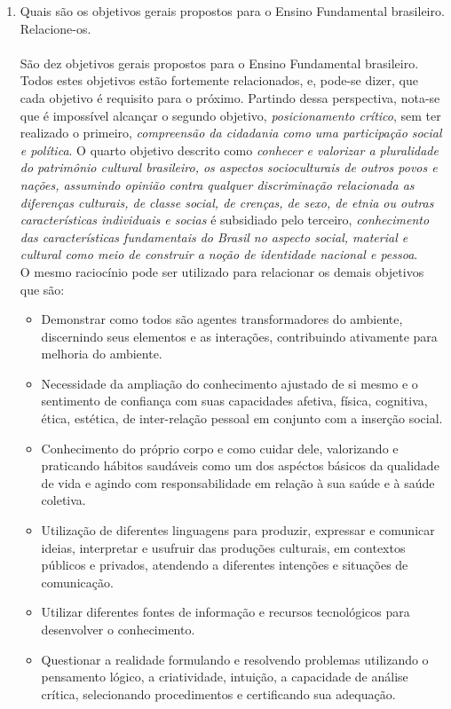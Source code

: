 \documentclass[a4paper, 12pt]{article}
\begin{document}
\begin{enumerate}
\item Quais são os objetivos gerais propostos para o Ensino Fundamental brasileiro. Relacione-os. \\ \\
  São dez objetivos gerais propostos para o Ensino Fundamental brasileiro. Todos estes objetivos estão fortemente relacionados, e, pode-se dizer, que cada objetivo é requisito para o próximo. Partindo dessa perspectiva, nota-se que é impossível alcançar o segundo objetivo, \emph{posicionamento crítico}, sem ter realizado o primeiro, \emph{compreensão da cidadania como uma participação social e política}.  O quarto objetivo descrito como \emph{conhecer e valorizar a pluralidade do patrimônio cultural brasileiro, os aspectos socioculturais de outros povos e nações, assumindo opinião contra qualquer discriminação relacionada as diferenças culturais, de classe social, de crenças, de sexo, de etnia ou outras características individuais e socias} é subsidiado pelo terceiro, \emph{conhecimento das características fundamentais do Brasil no aspecto social, material e cultural como meio de construir a noção de identidade nacional e pessoa}. \\
  O mesmo raciocínio pode ser utilizado para relacionar os demais objetivos que são:
  \begin{itemize}
  \item Demonstrar como todos são agentes transformadores do ambiente, discernindo seus elementos e as interações, contribuindo ativamente para melhoria do ambiente.
  \item Necessidade da ampliação do conhecimento ajustado de si mesmo e o sentimento de confiança com suas capacidades afetiva, física, cognitiva, ética, estética, de inter-relação pessoal em conjunto com a inserção social.
  \item Conhecimento do próprio corpo e como cuidar dele, valorizando e praticando hábitos saudáveis como um dos aspéctos básicos da qualidade de vida e agindo com responsabilidade em relação à sua saúde e à saúde coletiva.
  \item Utilização de diferentes linguagens para produzir, expressar e comunicar ideias, interpretar e usufruir das produções culturais, em contextos públicos e privados, atendendo a diferentes intenções e situações de comunicação.
  \item Utilizar diferentes fontes de informação e recursos tecnológicos para desenvolver o conhecimento.
  \item Questionar a realidade formulando e resolvendo problemas utilizando o pensamento lógico, a criatividade, intuição, a capacidade de análise crítica, selecionando procedimentos e certificando sua adequação.    

\end{itemize}
\end{enumerate}
\end{document}
